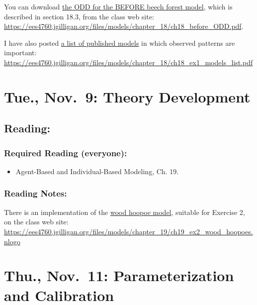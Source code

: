 \documentclass[
]{article}
\providecommand{\tightlist}{%
  \setlength{\itemsep}{0pt}\setlength{\parskip}{0pt}}
\begin{document}
You can download \href{/files/models/chapter_18/ch18_before_ODD.pdf}{the
ODD for the BEFORE beech forest model}, which is described in section
18.3, from the class web site:
\url{https://ees4760.jgilligan.org/files/models/chapter_18/ch18_before_ODD.pdf}.

I have also posted
\href{/files/models/chapter_18/ch18_ex1_models_list.pdf}{a list of
published models} in which observed patterns are important:
\url{https://ees4760.jgilligan.org/files/models/chapter_18/ch18_ex1_models_list.pdf}

\hypertarget{tue.-nov.-9-theory-development}{%
\section{Tue., Nov.~9: Theory
Development}\label{tue.-nov.-9-theory-development}}

\hypertarget{reading-20}{%
\subsection{Reading:}\label{reading-20}}

\hypertarget{required-reading-everyone-17}{%
\subsubsection{Required Reading
(everyone):}\label{required-reading-everyone-17}}

\begin{itemize}
\tightlist
\item
  Agent-Based and Individual-Based Modeling, Ch. 19.
\end{itemize}

\hypertarget{reading-notes-14}{%
\subsubsection{Reading Notes:}\label{reading-notes-14}}

There is an implementation of the
\href{/files/models/chapter_19/ch19_ex2_wood_hoopoes.nlogo}{wood hoopoe
model}, suitable for Exercise 2, on the class web site:
\url{https://ees4760.jgilligan.org/files/models/chapter_19/ch19_ex2_wood_hoopoes.nlogo}

\hypertarget{thu.-nov.-11-parameterization-and-calibration}{%
\section{Thu., Nov.~11: Parameterization and
Calibration}\label{thu.-nov.-11-parameterization-and-calibration}}
\end{document}
